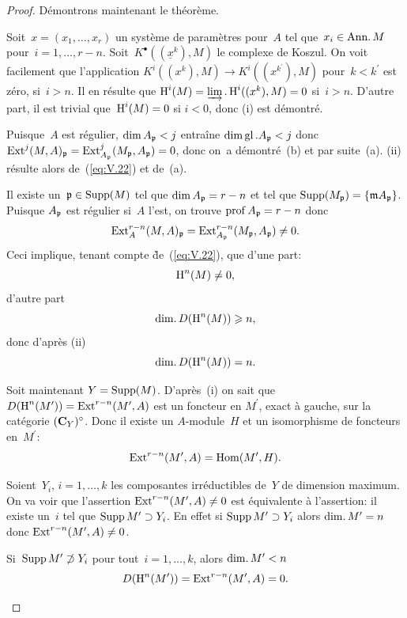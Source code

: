 \begin{proof}
D\'emontrons maintenant le th\'eor\`eme.
\begin{enumeratei}
\item
Soit~$x=(x_{1},\dots, x_{r})$ un syst\`eme de param\`etres pour~$A$ tel que~$x_{i}\in\mathrm{Ann}.\, M$ pour~$i=1,\dots, r-n$. Soit~$K^{\bullet}((\underline{x}^{k}), M)$ le complexe de Koszul. On voit facilement que l'application $K^{i}((x^{k}), M)\to K^{i}((x^{k^{\prime}}), M)$ pour~$k<k^{\prime}$ est z\'ero, si~$i>n$. Il en r\'esulte que $\operatorname{H}^{i}(M)=\varinjlim.\operatorname{H}^{i}((x^{k}), M)=0$ si~$i>n$. D'autre part, il est trivial que~$\operatorname{H}^{i}(M)=0$ si $i<0$, donc (i) est d\'emontr\'e.

\item
Puisque~$A$ est r\'egulier, $\dim A_{\mathfrak{p}}<j$ entra\^ine $\dim\operatorname{gl}{.}A_{\mathfrak{p}}<j$ donc $\operatorname{Ext}^{j}(M, A)_{\mathfrak{p}}=\operatorname{Ext}_{A_{\mathfrak{p}}}^{j}(M_{\mathfrak{p}}, A_{\mathfrak{p}})=0$, donc on~a d\'emontr\'e~(b) et par suite~(a). (ii) r\'esulte alors de~(\ref{eq:V.22}) et de~(a).

\item
Il existe un~$\mathfrak{p}\in\operatorname{Supp}(M)$ tel que $\dim A_{\mathfrak{p}}=r-n$ et tel que $\operatorname{Supp}(M_{\mathfrak{p}})=\{ \mathfrak{m} A_{\mathfrak{p}}\}$. Puisque $A_{\mathfrak{p}}$ est r\'egulier si~$A$ l'est, on trouve $\operatorname{prof} A_{\mathfrak{p}}=r-n$ donc
\begin{equation} \label{eq:V.23} \operatorname{Ext}_{A}^{r-n}(M, A)_{\mathfrak{p}}=\operatorname{Ext}_{A_{\mathfrak{p}}}^{r-n}(M_{\mathfrak{p}}, A_{\mathfrak{p}})\neq 0.
\end{equation}
Ceci implique, tenant compte \`{de}~(\ref{eq:V.22}), que d'une part:
$$
\operatorname{H}^{n}(M)\neq 0,
$$
d'autre part
$$
\mathrm{dim}.\, D(\operatorname{H}^{n}(M))\geqslant n,
$$
donc d'apr\`es (ii)
$$
\mathrm{dim}.\, D(\operatorname{H}^{n}(M))=n.
$$

Soit maintenant $Y=\operatorname{Supp}(M)$. D'apr\`es~(i) on sait que $D(\operatorname{H}^{n}(M^{\prime}))=\operatorname{Ext}^{r-n}(M^{\prime}, A)$ est un foncteur en $M^{\prime}$, exact \`a gauche, sur la cat\'egorie $(\mathbf{C}_{Y})^{\circ}$. Donc il existe un $A$-module~$H$ et un isomorphisme de foncteurs en~$M^{\prime}$:
$$
\operatorname{Ext}^{r-n}(M^{\prime}, A)=\operatorname{Hom}(M^{\prime}, H).
$$

Soient~$Y_{i}$, $i=1,\dots, k$ les composantes irr\'eductibles de~$Y$ de dimension maximum. On va voir que l'assertion $\operatorname{Ext}^{r-n}(M^{\prime}, A)\neq 0$ est \'equivalente \`a l'assertion: il existe un~$i$ tel que $\operatorname{Supp} M^{\prime}\supset Y_{i}$. En effet si $\operatorname{Supp} M^{\prime}\supset Y_{i}$ alors $\mathrm{dim}.\, M^{\prime}=n$ donc $\operatorname{Ext}^{r-n}(M^{\prime}, A)\neq 0$.

Si~$\operatorname{Supp} M^{\prime}\not\supset Y_{i}$ pour tout~$i=1,\dots, k$, alors $\mathrm{dim}.\, M^{\prime}<n$
$$D(\operatorname{H}^{n}(M^{\prime}))=\operatorname{Ext}^{r-n}(M^{\prime}, A)=0.
$$


\end{enumeratei}
\end{proof}
